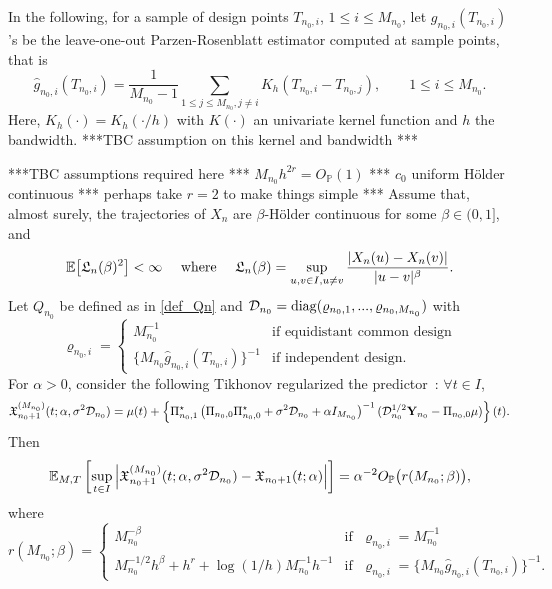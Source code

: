 \documentclass{article}
\begin{document}
In the following, for a sample of design points $T_{n_0,i}$, $1\leq i\leq M_{n_0}$, let $g_{n_0,i}(T_{n_0,i})$'s be the leave-one-out Parzen-Rosenblatt estimator computed at sample points, that is 
\begin{equation}\label{PR_weights}
\widehat g_{n_0,i}(T_{n_0,i}) = \frac{1}{M_{n_0}-1} \sum_{1\leq j \leq M_{n_0}, j\neq i} K_h(T_{n_0,i} - T_{n_0,j}),\qquad 1\leq i \leq M_{n_0}.
\end{equation}
Here, $K_h(\cdot) = K_h(\cdot/h)$ with $K(\cdot)$ an univariate kernel function and $h$ the bandwidth.  \color{red} ***TBC assumption on this kernel and bandwidth *** \color{black} 

\medskip

\begin{proposition}\label{prop:tikhonov}
\color{red} ***TBC assumptions required here *** $M_{n_0}h^{2r}=O_{\mathbb P}(1)$  ***  $c_0$ uniform Hölder continuous *** perhaps take $r=2$ to make things simple ***\color{black} Assume that, almost surely, the trajectories of  $X_{n}$ are $\beta$-Hölder continuous for some $\beta \in(0,1]$, and 
\begin{equation}\label{Lisch_cst}
\mathbb{E} \big[\mathfrak L_{n} (\beta)^2\big] <\infty \quad \text{ where } \quad 	\mathfrak L_n (\beta) = \sup_{u,v\in I, u\neq v}\frac{|X_n(u)-X_n(v)|}{|u-v|^\beta}.
\end{equation}
Let $Q_{n_0}$ be defined as in \eqref{def_Qn} and $\mathcal{D}_{n_0} = \operatorname{diag} (\varrho_{n_0,1},...,\varrho_{n_0,M_{n_0}})$ with
$$
	\varrho_{n_0,i} =  
\begin{cases}
	M_{n_0}^{-1} & \text{if equidistant common design}\\
	\{M_{n_0} \widehat g_{n_0,i}(T_{n_0,i})\}^{-1}	& \text{if independent design.}
	\end{cases}
$$ 
For $\alpha>0$, consider the following  Tikhonov regularized the predictor~: $\forall t\in I$,
\begin{equation}\label{our_reg_blup}
\mathfrak{X}^{(M_{n_0})}_{n_0+1}(t;\alpha,\sigma^2 \mathcal{D}_{n_0} )= \mu(t) + \left\{\Pi_{n_0,1}^\star \left( \Pi_{n_0,0}\Pi_{n_0,0}^\star 
	+  \sigma^2  \mathcal{D}_{n_0} +\alpha  I_{M_{n_0}}
	\right)^{-1}( \mathcal{D}_{n_0}^{1/2}\mathbf{Y}_{n_0}-\Pi_{n_0,0}\mu)\right\}(t).
\end{equation}
Then
$$
 \mathbb{E}_{M,T} \left[\sup_{t\in I}\Big|\mathfrak{X}^{(M_{n_0})}_{n_0+1}(t;\alpha,\sigma^2 \mathcal{D}_{n_0} ) - \mathfrak{X}_{n_0+1}(t;\alpha)\Big|\right] = \alpha^{-2}O_{\mathbb P}\big( r(M_{n_0};\beta)\big), 
$$
where
$$
	r(M_{n_0};\beta) = 
	\begin{cases}
		M_{n_0}^{-\beta} & \text{if } \; \varrho_{n_0,i} = M_{n_0}^{-1} \\
		M_{n_0}^{-1/2} h^{\beta} + h^r + \log(1/h) M_{n_0}^{-1}h^{-1} & \text{if } \;\varrho_{n_0,i} = \{M_{n_0} \widehat g_{n_0,i}(T_{n_0,i})\}^{-1} .
	\end{cases}
$$
\end{proposition}
\end{document}
